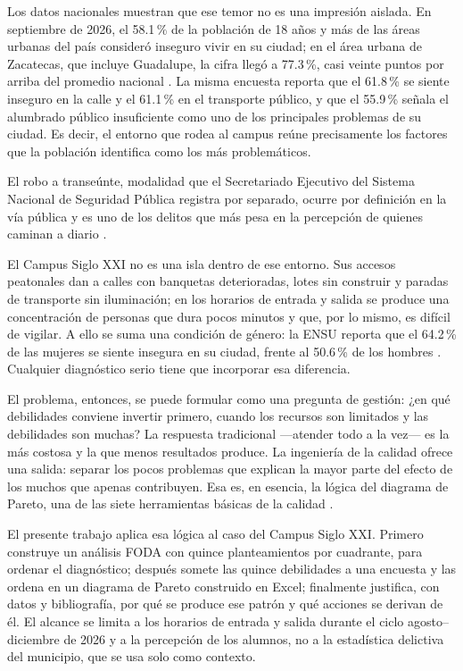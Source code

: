 \documentclass[11pt,a4paper]{article}
\begin{document}
Los datos nacionales muestran que ese temor no es una impresión aislada. En
septiembre de 2026, el 58.1\,\% de la población de 18 años y más de las áreas
urbanas del país consideró inseguro vivir en su ciudad; en el área urbana de
Zacatecas, que incluye Guadalupe, la cifra llegó a 77.3\,\%, casi veinte puntos
por arriba del promedio nacional \cite{inegi2026ensu}. La misma encuesta
reporta que el 61.8\,\% se siente inseguro en la calle y el 61.1\,\% en el
transporte público, y que el 55.9\,\% señala el alumbrado público insuficiente
como uno de los principales problemas de su ciudad. Es decir, el entorno que
rodea al campus reúne precisamente los factores que la población identifica
como los más problemáticos.

El robo a transeúnte, modalidad que el Secretariado Ejecutivo del Sistema
Nacional de Seguridad Pública registra por separado, ocurre por definición en la
vía pública y es uno de los delitos que más pesa en la percepción de quienes
caminan a diario \cite{sesnsp2026}.

El Campus Siglo XXI no es una isla dentro de ese entorno. Sus accesos
peatonales dan a calles con banquetas deterioradas, lotes sin construir y
paradas de transporte sin iluminación; en los horarios de entrada y salida se
produce una concentración de personas que dura pocos minutos y que, por lo
mismo, es difícil de vigilar. A ello se suma una condición de género: la ENSU
reporta que el 64.2\,\% de las mujeres se siente insegura en su ciudad, frente
al 50.6\,\% de los hombres \cite{inegi2026ensu}. Cualquier diagnóstico serio
tiene que incorporar esa diferencia.

El problema, entonces, se puede formular como una pregunta de gestión: ¿en qué
debilidades conviene invertir primero, cuando los recursos son limitados y las
debilidades son muchas? La respuesta tradicional ---atender todo a la vez--- es
la más costosa y la que menos resultados produce. La ingeniería de la calidad
ofrece una salida: separar los pocos problemas que explican la mayor parte del
efecto de los muchos que apenas contribuyen. Esa es, en esencia, la lógica del
diagrama de Pareto, una de las siete herramientas básicas de la calidad
\cite{ishikawa1986, gutierrez2014}.

El presente trabajo aplica esa lógica al caso del Campus Siglo XXI. Primero
construye un análisis FODA con quince planteamientos por cuadrante, para
ordenar el diagnóstico; después somete las quince debilidades a una encuesta y
las ordena en un diagrama de Pareto construido en Excel; finalmente justifica,
con datos y bibliografía, por qué se produce ese patrón y qué acciones se
derivan de él. El alcance se limita a los horarios de entrada y salida durante
el ciclo agosto--diciembre de 2026 y a la percepción de los alumnos, no a la
estadística delictiva del municipio, que se usa solo como contexto.
\end{document}
